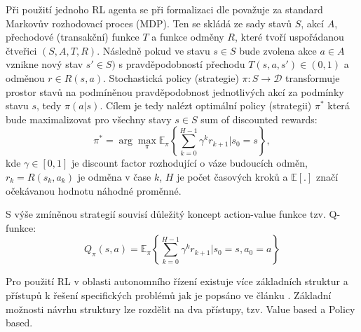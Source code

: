 \documentclass[czech, bc, kky, he, iso690numb]{fasthesis}
\begin{document}
            Při použití jednoho RL agenta se při formalizaci dle \cite{Deep_RL_survey, RLbook} považuje za standard Markovův rozhodovací proces (MDP). Ten se skládá ze sady stavů \(S\), akcí \(A\), přechodové (transakční) funkce \(T\) a funkce odměny \(R\), které tvoří uspořádanou čtveřici \((S, A, T, R)\). Následně pokud ve stavu \(s \in S\) bude zvolena akce \(a \in A\) vznikne nový stav \(s' \in S)\) s pravděpodobností přechodu \(T(s,a,s') \in (0,1)\) a odměnou \(r \in R(s,a)\). Stochastická policy (strategie) \(\pi : S \rightarrow \mathscr{D}\) transformuje prostor stavů na podmíněnou pravděpodobnost jednotlivých akcí za podmínky stavu \(s\), tedy \(\pi(a|s)\). Cílem je tedy nalézt optimální policy (strategii) \(\pi^{*}\) která bude maximalizovat pro všechny stavy \(s \in S\) sum of discounted rewards:
            	\begin{equation}
            		\pi^{*} = \arg \max_{\pi} \mathbb{E}_{\pi} \left\{\sum_{k=0}^{H-1}\gamma^{k}r_{k+1} | s_{0}=s\right\},
            	\end{equation}
            kde \(\gamma \in [0,1]\) je discount factor rozhodující o váze budoucích odměn, \(r_{k}=R(s_{k}, a_{k})\) je odměna v čase \(k\), \(H\) je počet časových kroků a \(\mathbb{E} [.]\) značí očekávanou hodnotu náhodné proměnné.
            
            S výše zmíněnou strategií souvisí důležitý koncept action-value funkce tzv. Q-funkce:
            	\begin{equation}
            		Q_{\pi}(s,a) = \mathbb{E}_{\pi} \left\{\sum_{k=0}^{H-1}\gamma^{k}r_{k+1} | s_{0}=s, a_{0}=a\right\}
            		\label{eqn:Q-function}
            	\end{equation}
            	
            Pro použití RL v oblasti autonomního řízení existuje více základních struktur a přístupů k řešení specifických problémů jak je popsáno ve článku \cite{Deep_RL_survey}. Základní možnosti návrhu struktury lze rozdělit na dva přístupy, tzv. Value based a Policy based.
\end{document}

